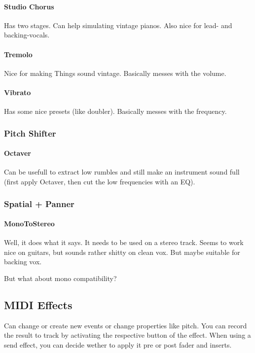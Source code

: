 \documentclass[10pt]{article}
\begin{document}
\paragraph{Studio Chorus} Has two stages. Can help simulating vintage pianos. Also nice for lead- and backing-vocals.

\paragraph{Tremolo} Nice for making Things sound vintage. Basically messes with the volume.

\paragraph{Vibrato} Has some nice presets (like doubler). Basically messes with the frequency.

\subsubsection{Pitch Shifter}

\paragraph{Octaver} Can be usefull to extract low rumbles and still make an instrument sound full (first apply  Octaver, then cut the low frequencies with an EQ).

\subsubsection{Spatial + Panner}

\paragraph{MonoToStereo} Well, it does what it says. It needs to be used on a stereo track. Seems to work nice on guitars, but sounds rather shitty on clean vox. But maybe suitable for backing vox.

But what about mono compatibility?

\subsection{MIDI Effects}

Can change or create new events or change properties like pitch. You can record the result to track by activating the respective button of the effect. When using a send effect, you can decide wether to apply it pre or post fader and inserts.
\end{document}
